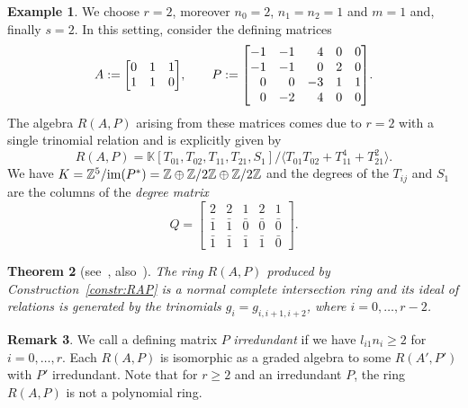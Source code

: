 \documentclass[10pt,a4paper]{amsart}
\newtheorem{thm}{Theorem}[section]
\theoremstyle{definition}
\newtheorem{exam}[thm]{Example}
\newtheorem{rema}[thm]{Remark}
\def\KK{{\mathbb K}}
\def\ZZ{{\mathbb Z}}
\numberwithin{equation}{section}
\begin{document}
\begin{exam}
\label{ex:running-ex-1}
We choose $r = 2$, moreover $n_0 = 2$, $n_1=n_2 = 1$ and
$m=1$ and, finally $s=2$. In this setting, consider
the defining matrices
\[A :=
\begin{bmatrix}
0 & 1 & 1
\\
1 & 1 & 0
\end{bmatrix}\!,
\qquad
P :=\begin{bmatrix}
-1 & -1 & $\phantom{$-$}$4 & 0 & 0
\\
-1 & -1 & $\phantom{$-$}$0 & 2 & 0
\\
$\phantom{$-$}$0 & $\phantom{$-$}$0 & -3 & 1 & 1
\\
$\phantom{$-$}$0 & -2 & $\phantom{$-$}$4 & 0 & 0
\end{bmatrix}\!.
\]
The algebra $R(A,P)$ arising from these matrices
comes due to $r=2$ with a single trinomial
relation and is explicitly given by
\[
R(A,P)
 =
\KK[T_{01},T_{02},T_{11},T_{21},S_1] / \big\langle T_{01}T_{02} + T_{11}^4 + T_{21}^2\big\rangle.
\]
We have
$K = \ZZ^5/{\rm im}(P^*) = \ZZ \oplus \ZZ/2\ZZ \oplus \ZZ / 2\ZZ$
and the degrees of the $T_{ij}$ and $S_1$ are
the columns of the \emph{degree matrix}
\[
Q =\begin{bmatrix}
2 & 2 & 1 & 2 & 1
\\
\bar 1 & \bar 1 & \bar 0 & \bar 0 & \bar 0
\\
\bar 1 & \bar 1 & \bar 1 & \bar 1 & \bar 0
\end{bmatrix}\!.
\]
\end{exam}


\begin{thm}[{see~\cite[Theorem~3.4.2.3]{ArDeHaLa}, also~\cite[Theorems~3.10 and 6.5]{HaHiWr}}]
The ring $R(A,P)$ produced by
Construction~{\rm \ref{constr:RAP}}
is a normal complete intersection ring
and its ideal of relations is generated
by the trinomials $g_i = g_{i,i+1,i+2}$,
where $i = 0, \dots, r-2$.
\end{thm}



\begin{rema}
We call a defining matrix $P$ \emph{irredundant} if we have
$l_{i1}n_i \ge 2$ for $i = 0,\dots, r$.
Each $R(A,P)$ is isomorphic as a graded algebra to
some $R(A',P')$ with $P'$ irredundant.
Note that for $r \ge 2$ and an irredundant $P$,
the ring $R(A,P)$ is not a polynomial ring.
\end{rema}
\end{document}

